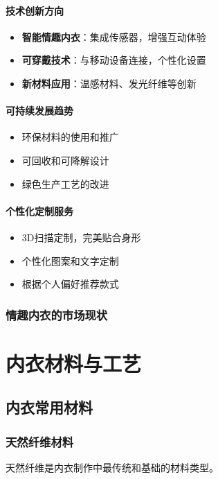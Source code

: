\documentclass[12pt,UTF8]{ctexbook}
\begin{document}
\subsection{技术创新方向}
\begin{itemize}[leftmargin=2cm]
	\item \textbf{智能情趣内衣}：集成传感器，增强互动体验
	\item \textbf{可穿戴技术}：与移动设备连接，个性化设置
	\item \textbf{新材料应用}：温感材料、发光纤维等创新
\end{itemize}

\subsection{可持续发展趋势}
\begin{itemize}[leftmargin=2cm]
	\item 环保材料的使用和推广
	\item 可回收和可降解设计
	\item 绿色生产工艺的改进
\end{itemize}

\subsection{个性化定制服务}
\begin{itemize}[leftmargin=2cm]
	\item 3D扫描定制，完美贴合身形
	\item 个性化图案和文字定制
	\item 根据个人偏好推荐款式
\end{itemize}

\section{情趣内衣的市场现状}

\part{内衣材料与工艺}

\chapter{内衣常用材料}
\section{天然纤维材料}
天然纤维是内衣制作中最传统和基础的材料类型。
\end{document}
